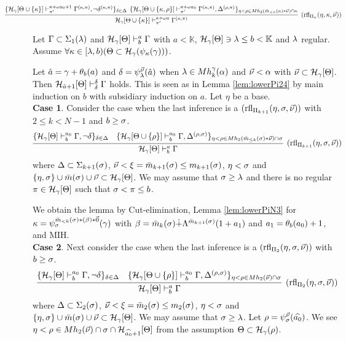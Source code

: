 \documentclass{article}
\newcommand{\mK}{\mathbb{K}}
\begin{document}
{\footnotesize
\[
\hspace{-15mm}
\infer[({\rm rfl}_{\Pi_{n}}(\eta,\kap,\vec{\nu}))]{
\calh_{\gam}[\Tht\cup \{\kap\}]\vdash^{\kap+\ome a}_{\pi^{\prime}}\Gam^{(\kap,\pi)}}
{
\{
\mathcal{H}_{\gam}[\Tht\cup \{\kap\}]\vdash^{\kap+\ome a_{0}+1}_{\pi^{\prime}}\Gam^{(\kap,\pi)}, 
\lnot\del^{(\kap,\pi)}
\}_{\del\in\Del}
&
\hspace{-2mm}
\{
\mathcal{H}_{\gam}[\Tht\cup \{\kap,\rho\}]\vdash^{\kap+\ome a_{0}}_{\pi^{\prime}}\Gam^{(\kap,\pi)}, 
\Del^{(\rho,\pi)}\}_{\eta<\rho\in Mh_{2}(\bar{m}_{<n}(\kap)*\vec{\nu})\cap \kap}
}
\]
}
\eprf


\blem\label{lem:lowerPi2N}
Let $\Gamma\subset\Sigma_{1}(\lambda)$ and
${\cal H}_{\gamma}[\Theta]\vdash^{a}_{b}\Gamma$ with $a<\mK$,
$\calh_{\gam}[\Tht]\ni\lam\leq b<\mK$ and
$\lambda$ regular.
Assume
$\forall\kappa\in[\lambda,b)(\Theta\subset{\cal H}_{\gamma}(\psi_{\kappa}(\gamma)))$.


Let $\hat{a}=\gamma+\theta_{b}(a)$ and 
$\delta=\psi_{\lambda}^{\vec{\nu}}(\hat{a})$ when $\lambda\in Mh_{k}^{\gamma}(\alpha)$ and $\vec{\nu}<\alpha$
with
$\vec{\nu}\subset{\cal H}_{\gamma}[\Theta]$.
Then
${\cal H}_{\hat{a}+1}[\Theta]\vdash^{\delta}_{\delta}\Gamma$ holds.
\elem
\bprf
This is seen as in Lemma \ref{lem:lowerPi24} by main induction on $b$ with subsidiary induction on $a$.
Let $\eta$ be a base.
\\
\textbf{Case 1}.
Consider the case when the last inference is a 
$({\rm rfl}_{\Pi_{k+1}}(\eta,\sigma,\vec{\nu}))$ with $2\leq k< N-1$ and $b\geq\sigma$.
{\small
\[
\infer[({\rm rfl}_{\Pi_{k+1}}(\eta,\sig,\vec{\nu}))]{
\calh_{\gam}[\Tht]\vdash^{a}_{b}\Gam}
{
\{
\mathcal{H}_{\gam}[\Tht]\vdash^{a_{0}}_{b}\Gamma, \lnot\del
\}_{\del\in\Del}
&
\{
\mathcal{H}_{\gam}[\Tht\cup \{\rho\}]\vdash^{a_{0}}_{b}\Gamma, 
\Del^{(\rho,\sig)}\}_{\eta<\rho\in Mh_{2}(\bar{m}_{\leq k}(\sig)*\vec{\nu})\cap \sig}
}
\]
}
where 
$\Delta\subset\Sigma_{k+1}(\sigma)$, $\vec{\nu}<\xi=\bar{m}_{k+1}(\sigma)\leq m_{k+1}(\sigma)$, $\eta<\sigma$
and $\{\eta,\sigma\}\cup\bar{m}(\sigma)\cup\vec{\nu}\subset{\cal H}_{\gamma}[\Theta]$.
We may assume that $\sigma\geq\lambda$ and
there is no regular $\pi\in{\cal H}_{\gamma}[\Theta]$ such that $\sigma<\pi\leq b$.

We obtain the lemma by Cut-elimination, Lemma \ref{lem:lowerPiN3} for
$\kappa=\psi_{\sigma}^{\bar{m}_{<k}(\sigma)*(\beta)*\vec{0}}(\gamma)$ with
$\beta=\bar{m}_{k}(\sigma)\dot{+}\Lambda^{\bar{m}_{k+1}(\sigma)}(1+a_{1})$ and
$a_{1}=\theta_{b}(a_{0})+1$,
and MIH.
\\
\textbf{Case 2}.
Next consider the case when the last inference is a 
$({\rm rfl}_{\Pi_{2}}(\eta,\sigma,\vec{\nu}))$ with $b\geq\sigma$.
{\small
\[
\infer[({\rm rfl}_{\Pi_{2}}(\eta,\sig,\vec{\nu}))]{
\calh_{\gam}[\Tht]\vdash^{a}_{b}\Gam}
{
\{
\mathcal{H}_{\gam}[\Tht]\vdash^{a_{0}}_{b}\Gamma, \lnot\del
\}_{\del\in\Del}
&
\{
\mathcal{H}_{\gam}[\Tht\cup \{\rho\}]\vdash^{a_{0}}_{b}\Gamma, 
\Del^{(\rho,\sig)}\}_{\eta<\rho\in Mh_{2}(\vec{\nu})\cap \sig}
}
\]
}
where 
$\Delta\subset\Sigma_{2}(\sigma)$, $\vec{\nu}<\xi=\bar{m}_{2}(\sigma)\leq m_{2}(\sigma)$, $\eta<\sigma$
and $\{\eta,\sigma\}\cup\bar{m}(\sigma)\cup\vec{\nu}\subset{\cal H}_{\gamma}[\Theta]$.
We may assume that $\sigma\geq\lambda$.
Let $\rho=\psi_{\sigma}^{\vec{\nu}}(\widehat{a_{0}})$. 
We see $\eta<\rho\in Mh_{2}(\vec{\nu})\cap\sigma\cap{\cal H}_{\widehat{a_{0}}+1}[\Theta]$ from
the assumption $\Theta\subset{\cal H}_{\gamma}(\rho)$.
\end{document}

